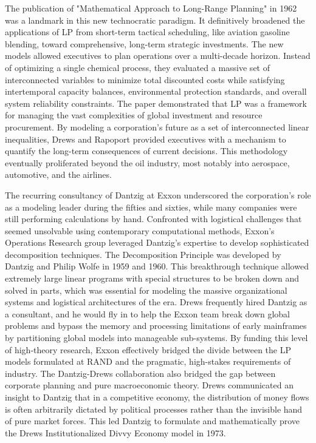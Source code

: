 The publication of "Mathematical Approach to Long-Range Planning" in 1962 was a landmark in this new technocratic paradigm. It definitively broadened the applications of LP from short-term tactical scheduling, like aviation gasoline blending, toward comprehensive, long-term strategic investments. The new models allowed executives to plan operations over a multi-decade horizon. Instead of optimizing a single chemical process, they evaluated a massive set of interconnected variables to minimize total discounted costs while satisfying intertemporal capacity balances, environmental protection standards, and overall system reliability constraints. The paper demonstrated that LP was a framework for managing the vast complexities of global investment and resource procurement. By modeling a corporation’s future as a set of interconnected linear inequalities, Drews and Rapoport provided executives with a mechanism to quantify the long-term consequences of current decisions. This methodology eventually proliferated beyond the oil industry, most notably into aerospace, automotive, and the airlines. 

The recurring consultancy of Dantzig at Exxon underscored the corporation’s role as a modeling leader during the fifties and sixties, while many companies were still performing calculations by hand. Confronted with logistical challenges that seemed unsolvable using contemporary computational methods, Exxon’s Operations Research group leveraged Dantzig’s expertise to develop sophisticated decomposition techniques. The Decomposition Principle was developed by Dantzig and Philip Wolfe in 1959 and 1960. This breakthrough technique allowed extremely large linear programs with special structures to be broken down and solved in parts, which was essential for modeling the massive organizational systems and logistical architectures of the era. Drews frequently hired Dantzig as a consultant, and he would fly in to help the Exxon team break down global problems and bypass the memory and processing limitations of early mainframes by partitioning global models into manageable sub-systems. By funding this level of high-theory research, Exxon effectively bridged the divide between the LP models formulated at RAND and the pragmatic, high-stakes requirements of industry. The Dantzig-Drews collaboration also bridged the gap between corporate planning and pure macroeconomic theory. Drews communicated an insight to Dantzig that in a competitive economy, the distribution of money flows is often arbitrarily dictated by political processes rather than the invisible hand of pure market forces. This led Dantzig to formulate and mathematically prove the Drews Institutionalized Divvy Economy model in 1973. 

